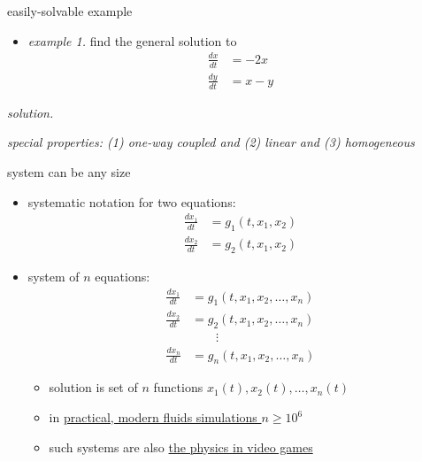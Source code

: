 \documentclass[urlcolor=blue,dvipsnames]{beamer}
\begin{document}
\begin{frame}{easily-solvable example}

\begin{itemize}
\item \emph{example 1.}  find the general solution to
\begin{align*}
\frac{dx}{dt} &= - 2 x\\
\frac{dy}{dt} &= x - y
\end{align*}
\end{itemize}

\noindent \emph{solution.}

\vspace{45mm}
\hfill \tiny \emph{special properties: (1) one-way coupled and (2) linear and (3) homogeneous}
\end{frame}


\begin{frame}{system can be any size}

\begin{itemize}
\item systematic notation for two equations:
\footnotesize
\begin{align*}
\frac{dx_1}{dt} &= g_1(t,x_1,x_2) \\
\frac{dx_2}{dt} &= g_2(t,x_1,x_2)
\end{align*}
\normalsize
\item system of $n$ equations:
\alert{
\begin{align*}
\frac{dx_1}{dt} &= g_1(t,x_1,x_2,\dots,x_n) \\
\frac{dx_2}{dt} &= g_2(t,x_1,x_2,\dots,x_n) \\
                &\qquad \vdots \\
\frac{dx_n}{dt} &= g_n(t,x_1,x_2,\dots,x_n)
\end{align*}
}
    \vspace{-2mm}
    \begin{itemize}
    \item solution is set of $n$ functions $x_1(t),x_2(t),\dots,x_n(t)$
    \item in \href{http://fluidityproject.github.io/}{practical, modern fluids simulations $n\ge 10^6$}
    \item such systems are also \href{https://pybullet.org/wordpress/}{the physics in video games}
    \end{itemize}
\end{itemize}
\end{frame}
\end{document}
